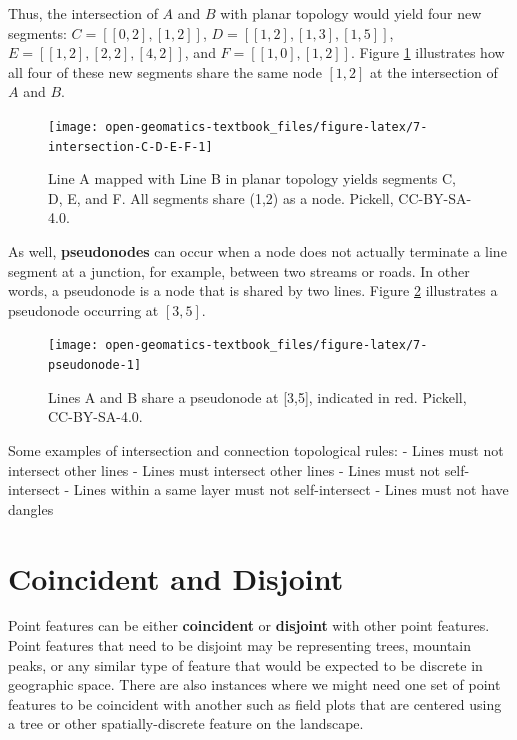 \documentclass[
]{book}
\begin{document}
Thus, the intersection of \(A\) and \(B\) with planar topology would yield four new segments: \(C=[[0,2],[1,2]]\), \(D=[[1,2],[1,3],[1,5]]\), \(E=[[1,2],[2,2],[4,2]]\), and \(F=[[1,0],[1,2]]\). Figure \ref{fig:7-intersection-C-D-E-F} illustrates how all four of these new segments share the same node \([1,2]\) at the intersection of \(A\) and \(B\).

\begin{figure}

{\centering \texttt{[image: open-geomatics-textbook\_files/figure-latex/7-intersection-C-D-E-F-1]} 

}

\caption{Line A mapped with Line B in planar topology yields segments C, D, E, and F. All segments share (1,2) as a node. Pickell, CC-BY-SA-4.0.}\label{fig:7-intersection-C-D-E-F}
\end{figure}

As well, \textbf{pseudonodes} can occur when a node does not actually terminate a line segment at a junction, for example, between two streams or roads. In other words, a pseudonode is a node that is shared by two lines. Figure \ref{fig:7-pseudonode} illustrates a pseudonode occurring at \([3,5]\).

\begin{figure}

{\centering \texttt{[image: open-geomatics-textbook\_files/figure-latex/7-pseudonode-1]} 

}

\caption{Lines A and B share a pseudonode at [3,5], indicated in red. Pickell, CC-BY-SA-4.0.}\label{fig:7-pseudonode}
\end{figure}

Some examples of intersection and connection topological rules:
- Lines must not intersect other lines
- Lines must intersect other lines
- Lines must not self-intersect
- Lines within a same layer must not self-intersect
- Lines must not have dangles

\hypertarget{coincident-and-disjoint}{%
\section{Coincident and Disjoint}\label{coincident-and-disjoint}}

Point features can be either \textbf{coincident} or \textbf{disjoint} with other point features. Point features that need to be disjoint may be representing trees, mountain peaks, or any similar type of feature that would be expected to be discrete in geographic space. There are also instances where we might need one set of point features to be coincident with another such as field plots that are centered using a tree or other spatially-discrete feature on the landscape.
\end{document}
